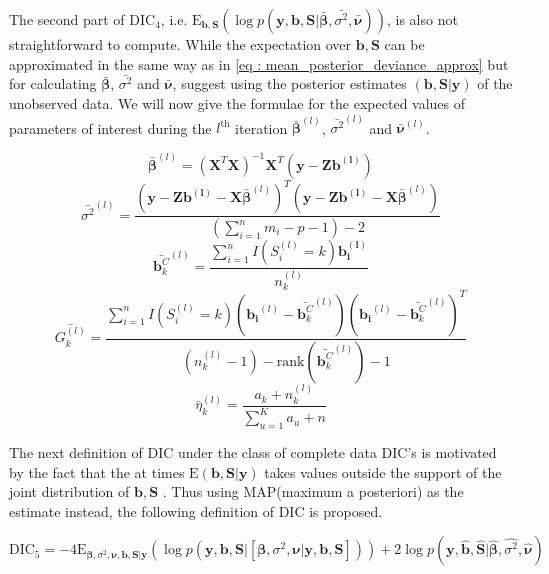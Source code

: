 The second part of $\text{DIC}_4$, i.e. $\text{E}_{\boldsymbol{b},\boldsymbol{S}}(\log{p(\boldsymbol{y}, \boldsymbol{b}, \boldsymbol{S}|\boldsymbol{\bar{\beta}}, \bar{\sigma^2}, \boldsymbol{\bar{\nu}})})$, is also not straightforward to compute. While the expectation over $\boldsymbol{b}, \boldsymbol{S}$ can be approximated in the same way as in \ref{eq : mean_posterior_deviance_approx} but for calculating $\boldsymbol{\bar{\beta}}$, $\bar{\sigma^2}$ and $\boldsymbol{\bar{\nu}}$, \citet{celeux_deviance_2006} suggest using the posterior estimates $(\boldsymbol{b}, \boldsymbol{S} | \boldsymbol{y})$ of the unobserved data. We will now give the formulae for the expected values of parameters of interest during the $l^\text{th}$ iteration $\boldsymbol{\bar{\beta}}^{(l)}$, $\bar{\sigma^2}^{(l)}$ and $\boldsymbol{\bar{\nu}}^{(l)}$.

$$\boldsymbol{\bar{\beta}}^{(l)} = (\boldsymbol{X}^T\boldsymbol{X})^{-1}\boldsymbol{X}^T(\boldsymbol{y}-\boldsymbol{Zb^{(l)}})$$
$$\bar{\sigma^2}^{(l)} = \frac {(\boldsymbol{y}-\boldsymbol{Zb^{(l)}}-\boldsymbol{X}\boldsymbol{\bar{\beta}}^{(l)})^T (\boldsymbol{y}-\boldsymbol{Zb^{(l)}}-\boldsymbol{X}\boldsymbol{\bar{\beta}}^{(l)})} {(\sum_{i=1}^n m_i - p - 1) -2}$$
$$\bar{\boldsymbol{b}_k^C}^{(l)} = \frac {\sum_{i=1}^n I(S_i^{(l)}=k) \boldsymbol{b_i^{(l)}}} {n_k^{(l)}}$$
$$\bar{G_k^{(l)}} = \frac {\sum_{i=1}^n I(S_i^{(l)}=k) (\boldsymbol{b_i}^{(l)}-\bar{\boldsymbol{b}_k^C}^{(l)})(\boldsymbol{b_i}^{(l)}-\bar{\boldsymbol{b}_k^C}^{(l)})^T} 
{(n_k^{(l)} - 1) - \text{rank}(\bar{\boldsymbol{b}_k^C}^{(l)}) - 1}$$
$$\bar{\eta}_k^{(l)} = \frac {a_k + n_k^{(l)}} {\sum_{u=1}^K a_u + n}$$

The next definition of DIC under the class of complete data DIC's is motivated by the fact that the at times $\text{E}(\boldsymbol{b}, \boldsymbol{S}|\boldsymbol{y})$ takes values outside the support of the joint distribution of $\boldsymbol{b}, \boldsymbol{S}$ \citet{celeux_deviance_2006}. Thus using MAP(maximum a posteriori) as the estimate instead, the following definition of DIC is proposed.

\begin{equation}
\label{eq : DIC5}
\text{DIC}_5 = -4\text{E}_{\boldsymbol{\beta}, \sigma^2, \boldsymbol{\nu},\boldsymbol{b}, \boldsymbol{S}|\boldsymbol{y}}(\log{p(\boldsymbol{y}, \boldsymbol{b}, \boldsymbol{S}|[\boldsymbol{\beta}, \sigma^2, \boldsymbol{\nu}|\boldsymbol{y}, \boldsymbol{b}, \boldsymbol{S}])}) + 
2\log{p(\boldsymbol{y}, \boldsymbol{\hat{b}}, \boldsymbol{\hat{S}}|\boldsymbol{\hat{\beta}}, \hat{\sigma^2}, \boldsymbol{\hat{\nu}})}
\end{equation}

